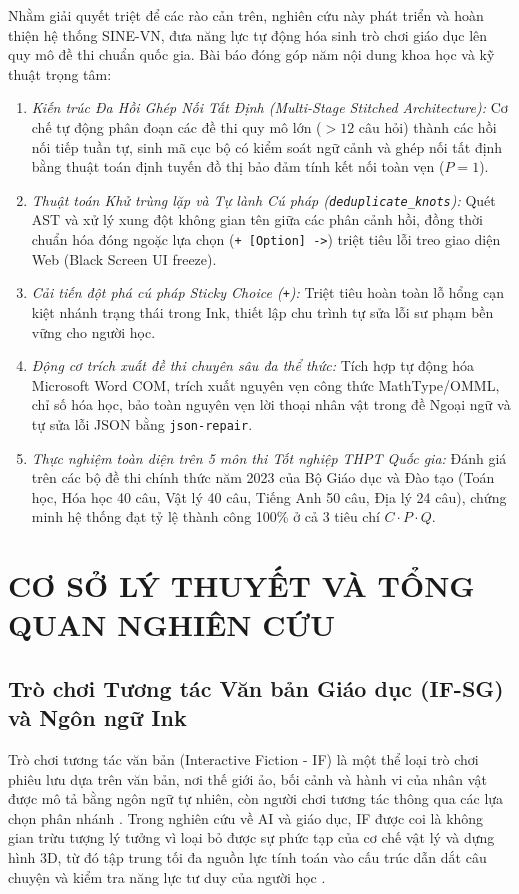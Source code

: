\documentclass[conference]{IEEEtran}
\begin{document}
Nhằm giải quyết triệt để các rào cản trên, nghiên cứu này phát triển và hoàn thiện hệ thống SINE-VN, đưa năng lực tự động hóa sinh trò chơi giáo dục lên quy mô đề thi chuẩn quốc gia. Bài báo đóng góp năm nội dung khoa học và kỹ thuật trọng tâm:
\begin{enumerate}
    \item \textit{Kiến trúc Đa Hồi Ghép Nối Tất Định (Multi-Stage Stitched Architecture):} Cơ chế tự động phân đoạn các đề thi quy mô lớn ($>12$ câu hỏi) thành các hồi nối tiếp tuần tự, sinh mã cục bộ có kiểm soát ngữ cảnh và ghép nối tất định bằng thuật toán định tuyến đồ thị bảo đảm tính kết nối toàn vẹn ($P = 1$).
    \item \textit{Thuật toán Khử trùng lặp và Tự lành Cú pháp (\texttt{deduplicate\_knots}):} Quét AST và xử lý xung đột không gian tên giữa các phân cảnh hồi, đồng thời chuẩn hóa đóng ngoặc lựa chọn (\texttt{+ [Option] ->}) triệt tiêu lỗi treo giao diện Web (Black Screen UI freeze).
    \item \textit{Cải tiến đột phá cú pháp Sticky Choice (\texttt{+}):} Triệt tiêu hoàn toàn lỗ hổng cạn kiệt nhánh trạng thái trong Ink, thiết lập chu trình tự sửa lỗi sư phạm bền vững cho người học.
    \item \textit{Động cơ trích xuất đề thi chuyên sâu đa thể thức:} Tích hợp tự động hóa Microsoft Word COM, trích xuất nguyên vẹn công thức MathType/OMML, chỉ số hóa học, bảo toàn nguyên vẹn lời thoại nhân vật trong đề Ngoại ngữ và tự sửa lỗi JSON bằng \texttt{json-repair}.
    \item \textit{Thực nghiệm toàn diện trên 5 môn thi Tốt nghiệp THPT Quốc gia:} Đánh giá trên các bộ đề thi chính thức năm 2023 của Bộ Giáo dục và Đào tạo (Toán học, Hóa học 40 câu, Vật lý 40 câu, Tiếng Anh 50 câu, Địa lý 24 câu), chứng minh hệ thống đạt tỷ lệ thành công 100\% ở cả 3 tiêu chí $C \cdot P \cdot Q$.
\end{enumerate}

\section{CƠ SỞ LÝ THUYẾT VÀ TỔNG QUAN NGHIÊN CỨU}
\subsection{Trò chơi Tương tác Văn bản Giáo dục (IF-SG) và Ngôn ngữ Ink}
Trò chơi tương tác văn bản (Interactive Fiction - IF) là một thể loại trò chơi phiêu lưu dựa trên văn bản, nơi thế giới ảo, bối cảnh và hành vi của nhân vật được mô tả bằng ngôn ngữ tự nhiên, còn người chơi tương tác thông qua các lựa chọn phân nhánh \cite{riedl2013}. Trong nghiên cứu về AI và giáo dục, IF được coi là không gian trừu tượng lý tưởng vì loại bỏ được sự phức tạp của cơ chế vật lý và dựng hình 3D, từ đó tập trung tối đa nguồn lực tính toán vào cấu trúc dẫn dắt câu chuyện và kiểm tra năng lực tư duy của người học \cite{rogosch2026}.
\end{document}
